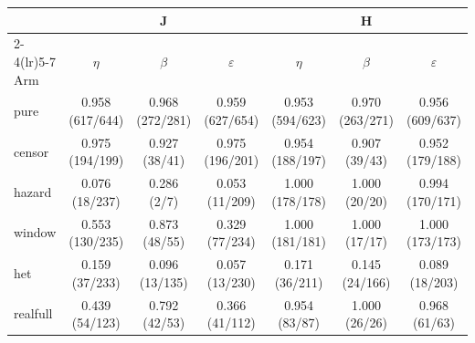 \begin{tabular}{lcccccc}
\toprule
 & \multicolumn{3}{c}{J} & \multicolumn{3}{c}{H} \\
\cmidrule(lr){2-4}\cmidrule(lr){5-7}
Arm & $\eta$ & $\beta$ & $\varepsilon$ & $\eta$ & $\beta$ & $\varepsilon$ \\
\midrule
pure & 0.958 (617/644) & 0.968 (272/281) & 0.959 (627/654) & 0.953 (594/623) & 0.970 (263/271) & 0.956 (609/637) \\
censor & 0.975 (194/199) & 0.927 (38/41) & 0.975 (196/201) & 0.954 (188/197) & 0.907 (39/43) & 0.952 (179/188) \\
hazard & 0.076 (18/237) & 0.286 (2/7) & 0.053 (11/209) & 1.000 (178/178) & 1.000 (20/20) & 0.994 (170/171) \\
window & 0.553 (130/235) & 0.873 (48/55) & 0.329 (77/234) & 1.000 (181/181) & 1.000 (17/17) & 1.000 (173/173) \\
het & 0.159 (37/233) & 0.096 (13/135) & 0.057 (13/230) & 0.171 (36/211) & 0.145 (24/166) & 0.089 (18/203) \\
realfull & 0.439 (54/123) & 0.792 (42/53) & 0.366 (41/112) & 0.954 (83/87) & 1.000 (26/26) & 0.968 (61/63) \\
\bottomrule
\end{tabular}
